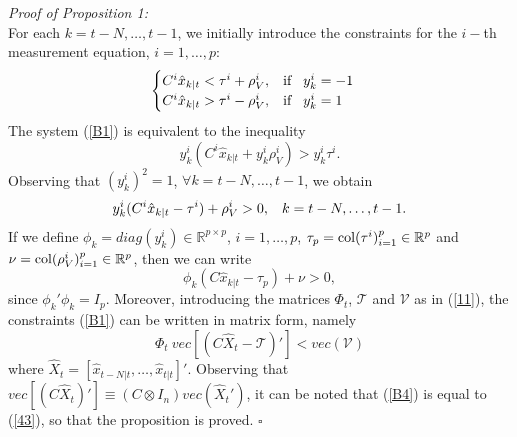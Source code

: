 \documentclass[11pt,journal,onecolumn]{IEEEtran}
\begin{document}
{\em Proof of Proposition 1:}\\
For each $k=t-N,\ldots,t-1$, we initially introduce the constraints for the $i-$th measurement equation, $i=1,\ldots,p$:
\begin{equation}\label{B1}
\begin{cases}
C^{i}\hat{x}_{k|t}<\tau^{i}+\rho_{V}^{i},\hspace{3mm}\text{if}\hspace{3mm}y_{k}^{i}=-1 \\
C^{i}\hat{x}_{k|t}>\tau^{i}-\rho_{V}^{i},\hspace{3mm}\text{if}\hspace{3mm}y_{k}^{i}=1
\end{cases}
\end{equation}
The system (\ref{B1}) is equivalent to the inequality
\begin{equation}\label{B2}
y_{k}^{i}(C^{i}\hat{x}_{k|t}+y_{k}^{i}\rho_{V}^{i})>y_{k}^{i}\tau^{i}.
\end{equation}
Observing that $(y_{k}^i)^{2}=1$, $\forall k=t-N,\ldots,t-1$, we obtain
\begin{equation*}\label{B3}
y_{k}^{i}(C^{i}\hat{x}_{k|t}-\tau^{i})+\rho_{V}^{i}>0,\hspace{3mm}k=t-N,\ldots,t-1.
\end{equation*}
If we define $\phi_{k}=diag(y_{k}^{i})\in\mathbb{R}^{p\times p}$, $i=1,\ldots,p$, $\tau_{p}={\rm col}(\tau^{i})_{i=1}^{p}\in\mathbb{R}^{p}$ and $\nu={\rm col}(\rho_{V}^{i})_{i=1}^{p}\in\mathbb{R}^{p}$, then we can write
\begin{equation*}
\phi_{k}(C\hat{x}_{k|t}-\tau_{p})+\nu>0,
\end{equation*}
since $\phi_{k}'\phi_{k}=I_{p}$. Moreover, introducing the matrices $\Phi_{t}$, $\mathcal{T}$ and $\mathcal{V}$ as in (\ref{11}), the constraints (\ref{B1}) can be written in matrix form, namely
\begin{equation}\label{B4}
\Phi_{t}~vec\left[(C\hat{X}_{t}-\mathcal{T})'\right]<vec(\mathcal{V})
\end{equation}
where $\hat{X}_{t}=\left[\hat{x}_{t-N|t},\ldots,\hat{x}_{t|t}\right]'$. Observing that $vec\left[(C\hat{X}_{t})'\right]\equiv(C\otimes I_{n})vec\left(\hat{X}_{t}'\right)$, it can be noted that  (\ref{B4}) is equal to  (\ref{43}),
so that the proposition is proved. \hfill $\square$
\vspace{.5cm}
\end{document}

